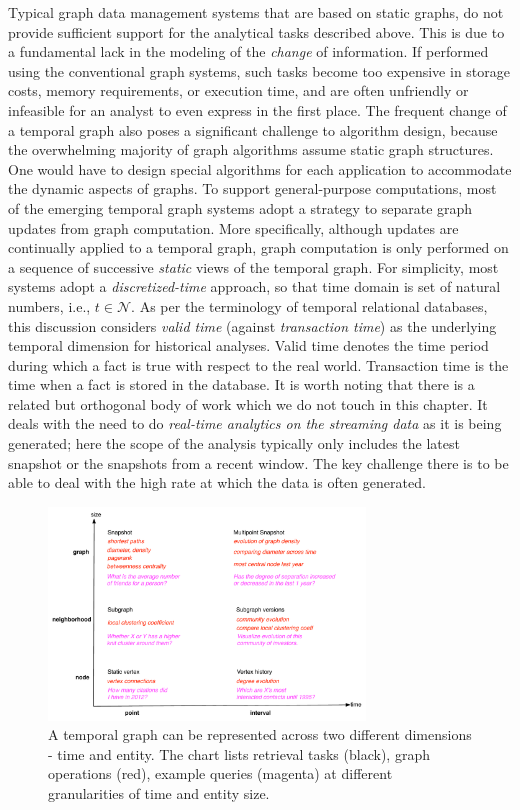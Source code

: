 \documentclass{svjour3}
\begin{document}
Typical graph data management systems that are based on static graphs, do not provide sufficient support for the analytical tasks described above. This is due to a fundamental lack in the modeling of the {\em change} of information. If performed using the conventional graph systems, such tasks become too expensive in storage costs, memory requirements, or execution time, and are often unfriendly or infeasible for an analyst to even express in the first place. 
The frequent change of a temporal graph also poses a significant challenge to algorithm design, because the overwhelming majority of graph algorithms assume static graph structures. One would have to design special algorithms for each application to accommodate the dynamic aspects of graphs. To support general-purpose computations, most of the emerging temporal graph systems adopt a strategy to separate graph updates from graph computation. More specifically, although updates are continually applied to a temporal graph, graph computation is only performed on a sequence of successive \emph{static} views of the temporal graph. For simplicity, most systems adopt a \emph{discretized-time} approach, so that time domain is set of natural numbers, i.e., $t\in \mathcal{N}$. 
As per the terminology of temporal relational databases, this discussion considers {\em valid time} (against {\em transaction time}) as the underlying temporal dimension for historical analyses. Valid time denotes the time
period during which a fact is true with respect to the real world. Transaction time is the time
when a fact is stored in the database. 
It is worth noting that there is a related but orthogonal body of work which we do not touch in this chapter. It deals with the need to do {\em real-time analytics on the streaming data} as it is being generated; here the scope of the analysis typically only includes the latest snapshot or the snapshots from a recent window. The key challenge there is to be able to deal with the high rate at which the data is often generated.

\begin{figure}
\centering
\includegraphics [width=0.75\textwidth]{entity-time.pdf}
\caption{A temporal graph can be represented across two different dimensions - time
and entity. The chart lists retrieval tasks (black), graph operations (red), example queries
(magenta) at different granularities of time and entity size.}
\label{fig:et}
\end{figure}
\end{document}
